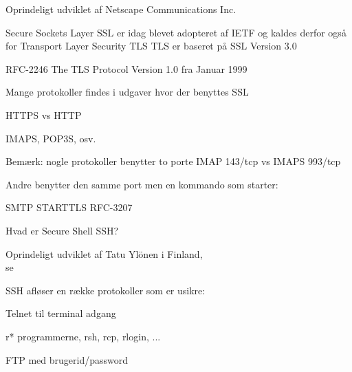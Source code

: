 \documentclass[Screen16to9,17pt]{foils}
\begin{document}


\begin{list1}
\item Oprindeligt udviklet af Netscape Communications Inc.
\item Secure Sockets Layer SSL er idag blevet adopteret af IETF og kaldes
derfor også for Transport Layer Security TLS
TLS er baseret på SSL Version 3.0
\item RFC-2246 The TLS Protocol Version 1.0 fra Januar 1999
\end{list1}


\begin{list1}
\item Mange protokoller findes i udgaver hvor der benyttes SSL
\item HTTPS vs HTTP
\item IMAPS, POP3S, osv.
\item Bemærk: nogle protokoller benytter to porte IMAP 143/tcp vs IMAPS 993/tcp
\item Andre benytter den samme port men en kommando som starter:
\item SMTP STARTTLS RFC-3207
\end{list1}




\begin{list1}
\item Hvad er Secure Shell SSH?
\item Oprindeligt udviklet af Tatu Ylönen i Finland,\\
se 
\item SSH afløser en række protokoller som er usikre:
  \begin{list2}
  \item Telnet til terminal adgang
  \item r* programmerne, rsh, rcp, rlogin, ...
  \item FTP med brugerid/password
  \end{list2}
\end{list1}
\end{document}
